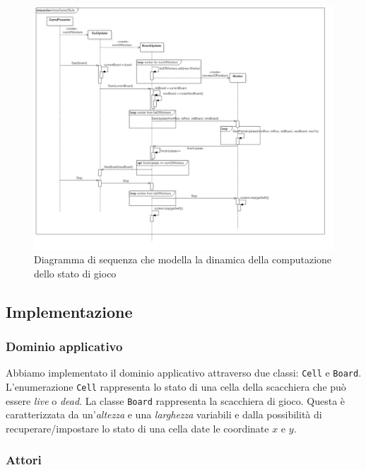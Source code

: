 \documentclass[a4paper]{report}
\begin{document}
\begin{figure}[H]
    \centering
    \includegraphics[width=\linewidth, height=\textheight, keepaspectratio]{res/ActorGameOfLife.png}
    \caption{Diagramma di sequenza che modella la dinamica della computazione dello stato di gioco}
    \label{fig:sequencediagram}
\end{figure}

\subsection{Implementazione}\label{implementazione-1}

\subsubsection{Dominio applicativo}\label{dominio-applicativo-1}

Abbiamo implementato il dominio applicativo attraverso due classi: \texttt{Cell} e \texttt{Board}.\\
L'enumerazione \texttt{Cell} rappresenta lo stato di una cella della scacchiera che può essere \textit{live} o \textit{dead}.
La classe \texttt{Board} rappresenta la scacchiera di gioco. Questa è caratterizzata da un'\textit{altezza} e una \textit{larghezza} variabili e dalla possibilità di recuperare/impostare lo stato di una cella date le coordinate $x$ e $y$.

\subsubsection{Attori}\label{attori}
\end{document}

